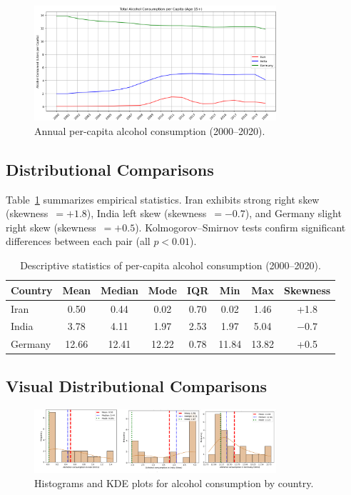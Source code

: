 \documentclass[12pt,a4paper]{article}
\begin{document}
	\begin{figure}[ht]
		\centering
		\includegraphics[width=0.8\textwidth]{figure-1.png}
		\caption{Annual per-capita alcohol consumption (2000--2020).}
		\label{fig:trend}
	\end{figure}
	
	\subsection{Distributional Comparisons}
	Table~\ref{tab:stats} summarizes empirical statistics. Iran exhibits strong right skew (skewness~$=+1.8$), India left skew (skewness~$=-0.7$), and Germany slight right skew (skewness~$=+0.5$). Kolmogorov--Smirnov tests confirm significant differences between each pair (all $p<0.01$).
	
	\begin{table}[ht]
		\centering
		\caption{Descriptive statistics of per-capita alcohol consumption (2000--2020).}
		\label{tab:stats}
		\begin{tabular}{lccccccc}
			\toprule
			Country & Mean & Median & Mode & IQR & Min & Max & Skewness \\
			\midrule
			Iran    & 0.50  & 0.44   & 0.02 & 0.70 & 0.02 & 1.46 & +1.8 \\
			India   & 3.78  & 4.11   & 1.97 & 2.53 & 1.97 & 5.04 & $-0.7$ \\
			Germany & 12.66 & 12.41  & 12.22& 0.78 &11.84 &13.82 & +0.5 \\
			\bottomrule
		\end{tabular}
	\end{table}
	
	\subsection{Visual Distributional Comparisons}
	
	\begin{figure}[ht]
		\centering
		\includegraphics[width=0.8\textwidth]{figure-2.png}
		\caption{Histograms and KDE plots for alcohol consumption by country.}
		\label{fig:hist-kde}
	\end{figure}
	
\end{document}
